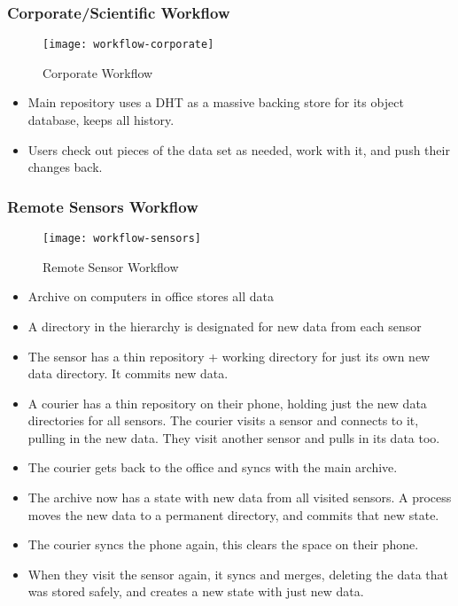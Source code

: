 \documentclass[a4paper]{article}
\begin{document}
\subsubsection{Corporate/Scientific Workflow}

  \begin{figure}[h]
    \caption{Corporate Workflow}
    \label{fig:workflow-corporate}
    \centering
      \texttt{[image: workflow-corporate]}
  \end{figure}

  \begin{itemize}
  \item
    Main repository uses a DHT as a massive backing store for its object
    database, keeps all history.
  \item
    Users check out pieces of the data set as needed, work with it, and
    push their changes back.
  \end{itemize}

\subsubsection{Remote Sensors Workflow}

  \begin{figure}[h]
    \caption{Remote Sensor Workflow}
    \label{fig:workflow-sensors}
    \centering
      \texttt{[image: workflow-sensors]}
  \end{figure}

  \begin{itemize}
  \item
    Archive on computers in office stores all data
  \item
    A directory in the hierarchy is designated for new data from each sensor
  \item
    The sensor has a thin repository + working directory for just its own new
    data directory. It commits new data.
  \item
    A courier has a thin repository on their phone, holding just the new data
    directories for all sensors. The courier visits a sensor and connects to it,
    pulling in the new data. They visit another sensor and pulls in its data
    too.
  \item
    The courier gets back to the office and syncs with the main archive.
  \item
    The archive now has a state with new data from all visited sensors. A
    process moves the new data to a permanent directory, and commits that new
    state.
  \item
    The courier syncs the phone again, this clears the space on their phone.
  \item
    When they visit the sensor again, it syncs and merges, deleting the data
    that was stored safely, and creates a new state with just new data.
  \end{itemize}
\end{document}
